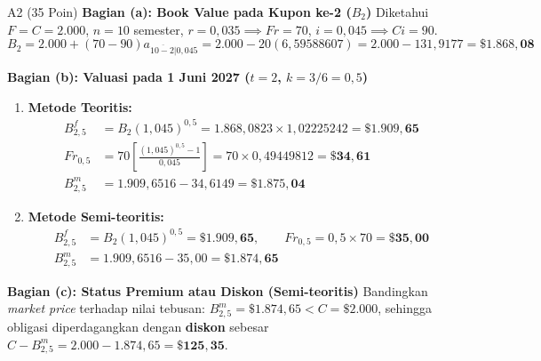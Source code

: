 \documentclass[11pt,a4paper]{article}
\newcommand{\angl}[1]{\overline{#1|}}
\begin{document}
\begin{solusibox}{A2 (35 Poin)}
\textbf{Bagian (a): Book Value pada Kupon ke-2 ($B_2$)}
Diketahui $F = C = 2.000$, $n = 10$ semester, $r = 0{,}035 \implies Fr = 70$, $i = 0{,}045 \implies Ci = 90$.
\[
    B_2 = 2.000 + (70 - 90)a_{\angl{10-2}0{,}045} = 2.000 - 20(6{,}59588607) = 2.000 - 131{,}9177 = \mathbf{\$1.868{,}08}
\]

\textbf{Bagian (b): Valuasi pada 1 Juni 2027 ($t = 2$, $k = 3/6 = 0{,}5$)}
\begin{enumerate}[label=(\roman*), leftmargin=6mm, topsep=1pt, itemsep=1pt]
    \item \textbf{Metode Teoritis:}
    \begin{align*}
        B_{2{,}5}^f &= B_2(1{,}045)^{0{,}5} = 1.868{,}0823 \times 1{,}02225242 = \mathbf{\$1.909{,}65} \\
        Fr_{0{,}5} &= 70 \left[\frac{(1{,}045)^{0{,}5} - 1}{0{,}045}\right] = 70 \times 0{,}49449812 = \mathbf{\$34{,}61} \\
        B_{2{,}5}^m &= 1.909{,}6516 - 34{,}6149 = \mathbf{\$1.875{,}04}
    \end{align*}
    \item \textbf{Metode Semi-teoritis:}
    \begin{align*}
        B_{2{,}5}^f &= B_2(1{,}045)^{0{,}5} = \mathbf{\$1.909{,}65}, \qquad Fr_{0{,}5} = 0{,}5 \times 70 = \mathbf{\$35{,}00} \\
        B_{2{,}5}^m &= 1.909{,}6516 - 35{,}00 = \mathbf{\$1.874{,}65}
    \end{align*}
\end{enumerate}

\textbf{Bagian (c): Status Premium atau Diskon (Semi-teoritis)}
Bandingkan \textit{market price} terhadap nilai tebusan: $B_{2{,}5}^m = \$1.874{,}65 < C = \$2.000$, sehingga obligasi diperdagangkan dengan \textbf{diskon} sebesar $C - B_{2{,}5}^m = 2.000 - 1.874{,}65 = \mathbf{\$125{,}35}$.
\end{solusibox}
\end{document}
